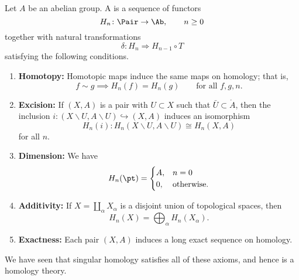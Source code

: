 \documentclass[main.tex]{subfiles}
\begin{document}
\begin{definition}
  \label{def:homology_theory}
  Let $A$ be an abelian group. A  is a sequence of functors
  \begin{equation*}
    H_{n}\colon \Pair \to \Ab,\qquad n \geq 0
  \end{equation*}
  together with natural transformations
  \begin{equation*}
    \delta\colon H_{n} \Rightarrow H_{n-1} \circ T
  \end{equation*}
  satisfying the following conditions.
  \begin{enumerate}
    \item \textbf{Homotopy:} Homotopic maps induce the same maps on homology; that is,
      \begin{equation*}
        f \sim g \implies H_{n}(f) = H_{n}(g) \qquad\text{for all } f, g, n.
      \end{equation*}

    \item \textbf{Excision:} If $(X, A)$ is a pair with $U \subset X$ such that $\bar{U} \subset \mathring{A}$, then the inclusion $i\colon (X\smallsetminus U, A \smallsetminus U) \hookrightarrow (X, A)$ induces an isomorphism
      \begin{equation*}
        H_{n}(i)\colon H_{n}(X\smallsetminus U, A\smallsetminus U) \cong H_{n}(X, A)
      \end{equation*}
      for all $n$.

    \item \textbf{Dimension:} We have
      \begin{equation*}
        H_{n}(\pt) =
        \begin{cases}
          A, &n = 0 \\
          0, &\text{otherwise}.
        \end{cases}
      \end{equation*}

    \item \textbf{Additivity:} If $X = \coprod_{\alpha} X_{\alpha}$ is a disjoint union of topological spaces, then
      \begin{equation*}
        H_{n}(X) = \bigoplus_{\alpha} H_{n}(X_{\alpha}).
      \end{equation*}

    \item \textbf{Exactness:} Each pair $(X, A)$ induces a long exact sequence on homology.
  \end{enumerate}
\end{definition}

We have seen that singular homology satisfies all of these axioms, and hence is a homology theory.
\end{document}

